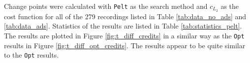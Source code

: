 Change points were calculated with \texttt{Pelt} as the search method and $c_{L_2}$ as the cost function for all of the 279 recordings listed in Table \ref{tab:data_no_ads} and \ref{tab:data_ads}. %
Statistics of the results %
are listed in Table \ref{tab:statistics_pelt}.
The results are plotted in Figure \ref{fig:t_diff_credits} in a similar way as the \texttt{Opt} results in Figure \ref{fig:t_diff_opt_credits}. The results appear to be quite similar to the \texttt{Opt} results.

